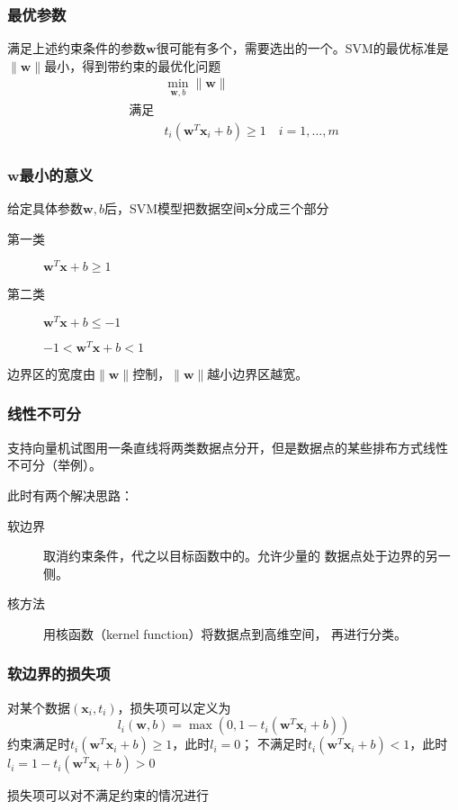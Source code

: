 \documentclass[14pt]{beamer}
\renewcommand{\vec}[1]{\bm{#1}}
\newcommand{\Vx}{\vec{x}}
\newcommand{\Vw}{\vec{w}}
\let\emph\relax %
\begin{document}
\begin{frame}
  \frametitle{最优参数}
  满足上述约束条件的参数$\Vw$很可能有多个，需要选出\emph{最优}的一个。SVM的最优标准是$\|\Vw\|$最小，得到带约束的最优化问题
  \begin{equation}
    \begin{aligned}
    &\min_{\Vw,b} \|\Vw\|\\
    \text{满足}&\\
    &t_i(\Vw^T\Vx_i+b)\ge1\quad\text{$i=1,\ldots,m$}
  \end{aligned}
\end{equation}
\end{frame}

\begin{frame}
  \frametitle{$\Vw$最小的意义}
  给定具体参数$\Vw,b$后，SVM模型把数据空间$\Vx$分成三个部分
  \begin{description}
    \item[第一类] $\Vw^T\Vx+b\ge1$ 
    \item[第二类] $\Vw^T\Vx+b\le-1$ 
    \item[\emph{边界区}] $-1<\Vw^T\Vx+b<1$ 
  \end{description}

  边界区的宽度由$\|\Vw\|$控制，$\|\Vw\|$越小边界区越宽。
\end{frame}

\begin{frame}
  \frametitle{线性不可分}
  支持向量机试图用一条直线将两类数据点分开，但是数据点的某些排布方式线性
  不可分（举例）。

  此时有两个解决思路：
  \begin{description}
    \item[软边界] 取消约束条件，代之以目标函数中的\emph{损失项}。允许少量的
    数据点处于边界的另一侧。
    \item[核方法] 用核函数（kernel function）将数据点\emph{映射}到高维空间，
    再进行分类。 
  \end{description}
\end{frame}

\begin{frame}
  \frametitle{软边界的损失项}
  对某个数据$(\Vx_i, t_i)$，损失项可以定义为
  \begin{equation}
    l_i(\Vw, b)=\max(0, 1-t_i(\Vw^T\Vx_i+b))
  \end{equation}
  约束满足时$t_i(\Vw^T\Vx_i+b)\ge1$，此时$l_i=0$；
  不满足时$t_i(\Vw^T\Vx_i+b)<1$，此时$l_i=1-t_i(\Vw^T\Vx_i+b)>0$

  损失项可以对不满足约束的情况进行\emph{惩罚}
\end{frame}
\end{document}
